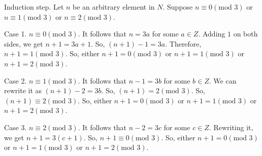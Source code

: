 \documentclass{article}
\begin{document}
Induction step. Let $n$ be an arbitrary element in $N$. Suppose
$n \equiv 0 (\text{mod } 3)$ or $n \equiv 1 (\text{mod } 3)$ or
$n \equiv 2 (\text{mod } 3)$.

Case 1. $n \equiv 0 (\text{mod } 3)$. It follows that $n = 3a$ for
some $a \in Z$. Adding $1$ on both sides, we get $n+1 = 3a + 1$. So,
$(n+1) - 1 = 3a$. Therefore, $n+1 = 1(\text{mod } 3)$. So, either
$n+1 = 0(\text{mod } 3)$ or $n+1 = 1(\text{mod } 3)$ or
$n+1 = 2(\text{mod } 3)$.

Case 2. $n \equiv 1 (\text{mod } 3)$. It follows that $n-1=3b$ for
some $b \in Z$. We can rewrite it as $(n+1) - 2 = 3b$. So,
$(n+1) = 2(\text{mod } 3)$. So, $(n+1) \equiv 2(\text{mod } 3)$. So,
either $n+1 = 0(\text{mod } 3)$ or $n+1 = 1(\text{mod } 3)$ or
$n+1 = 2(\text{mod } 3)$.

Case 3. $n \equiv 2 (\text{mod } 3)$. It follows that $n-2 = 3c$ for
some $c \in Z$. Rewriting it, we get $n+1 = 3(c+1)$. So,
$n+1 \equiv 0 (\text{mod } 3)$. So, either $n+1 = 0(\text{mod } 3)$ or
$n+1 = 1(\text{mod } 3)$ or $n+1 = 2(\text{mod } 3)$.
\end{document}

